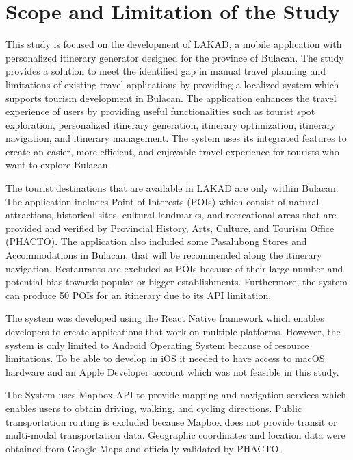\section{Scope and Limitation of the Study}

This study is focused on the development of LAKAD, a mobile application with personalized itinerary generator designed for the province of Bulacan. The study provides a solution to meet the identified gap in manual travel planning and limitations of existing travel applications by providing a localized system which supports tourism development in Bulacan. The application enhances the travel experience of users by providing useful functionalities such as tourist spot exploration, personalized itinerary generation, itinerary optimization, itinerary navigation, and itinerary management. The system uses its integrated features to create an easier, more efficient, and enjoyable travel experience for tourists who want to explore Bulacan.

The tourist destinations that are available in LAKAD are only within Bulacan. The application includes Point of Interests (POIs) which consist of natural attractions, historical sites, cultural landmarks, and recreational areas that are provided and verified by Provincial History, Arts, Culture, and Tourism Office (PHACTO). The application also included some Pasalubong Stores and Accommodations in Bulacan, that will be recommended along the itinerary navigation. Restaurants are excluded as POIs because of their large number and potential bias towards popular or bigger establishments. Furthermore, the system can produce 50 POIs for an itinerary due to its API limitation.

The system was developed using the React Native framework which enables developers to create applications that work on multiple platforms. However, the system is only limited to Android Operating System because of resource limitations. To be able to develop in iOS it needed to have access to macOS hardware and an Apple Developer account which was not feasible in this study. 

The System uses Mapbox API to provide mapping and navigation services which enables users to obtain driving, walking, and cycling directions. Public transportation routing is excluded because Mapbox does not provide transit or multi-modal transportation data. Geographic coordinates and location data were obtained from Google Maps and officially validated by PHACTO.

